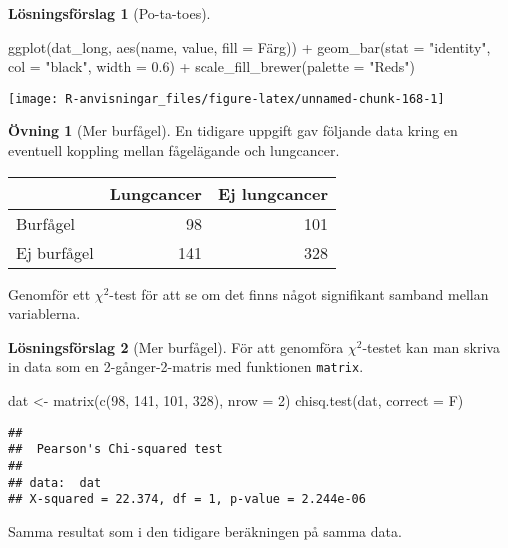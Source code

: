 \documentclass[
]{book}
\newenvironment{Shaded}{\begin{snugshade}}{\end{snugshade}}
\newcommand{\AttributeTok}[1]{\textcolor[rgb]{0.77,0.63,0.00}{#1}}
\newcommand{\DecValTok}[1]{\textcolor[rgb]{0.00,0.00,0.81}{#1}}
\newcommand{\FloatTok}[1]{\textcolor[rgb]{0.00,0.00,0.81}{#1}}
\newcommand{\FunctionTok}[1]{\textcolor[rgb]{0.00,0.00,0.00}{#1}}
\newcommand{\NormalTok}[1]{#1}
\newcommand{\OtherTok}[1]{\textcolor[rgb]{0.56,0.35,0.01}{#1}}
\newcommand{\SpecialCharTok}[1]{\textcolor[rgb]{0.00,0.00,0.00}{#1}}
\newcommand{\StringTok}[1]{\textcolor[rgb]{0.31,0.60,0.02}{#1}}
\theoremstyle{definition}
\theoremstyle{definition}
\theoremstyle{definition}
\newtheorem{exercise}{Övning}[chapter]
\theoremstyle{definition}
\newtheorem{hypothesis}{Lösningsförslag}[chapter]
\theoremstyle{remark}
\begin{document}
\begin{hypothesis}[Po-ta-toes]
\begin{Shaded}
\begin{Highlighting}[]
\FunctionTok{ggplot}\NormalTok{(dat\_long, }\FunctionTok{aes}\NormalTok{(name, value, }\AttributeTok{fill =}\NormalTok{ Färg)) }\SpecialCharTok{+}
  \FunctionTok{geom\_bar}\NormalTok{(}\AttributeTok{stat =} \StringTok{"identity"}\NormalTok{, }\AttributeTok{col =} \StringTok{"black"}\NormalTok{, }\AttributeTok{width =} \FloatTok{0.6}\NormalTok{) }\SpecialCharTok{+}
  \FunctionTok{scale\_fill\_brewer}\NormalTok{(}\AttributeTok{palette =} \StringTok{"Reds"}\NormalTok{)}
\end{Highlighting}
\end{Shaded}

\begin{center}\texttt{[image: R-anvisningar\_files/figure-latex/unnamed-chunk-168-1]} \end{center}

\end{hypothesis}

\begin{exercise}[Mer burfågel]
En tidigare uppgift gav följande data kring en eventuell koppling mellan fågelägande och lungcancer.

\begin{table}
\centering
\begin{tabular}[t]{lrr}
\toprule
  & Lungcancer & Ej lungcancer\\
\midrule
Burfågel & 98 & 101\\
Ej burfågel & 141 & 328\\
\bottomrule
\end{tabular}
\end{table}

Genomför ett \(\chi^2\)-test för att se om det finns något signifikant samband mellan variablerna.
\end{exercise}

\begin{hypothesis}[Mer burfågel]
För att genomföra \(\chi^2\)-testet kan man skriva in data som en 2-gånger-2-matris med funktionen \texttt{matrix}.

\begin{Shaded}
\begin{Highlighting}[]
\NormalTok{dat }\OtherTok{\textless{}{-}} \FunctionTok{matrix}\NormalTok{(}\FunctionTok{c}\NormalTok{(}\DecValTok{98}\NormalTok{, }\DecValTok{141}\NormalTok{, }\DecValTok{101}\NormalTok{, }\DecValTok{328}\NormalTok{), }\AttributeTok{nrow =} \DecValTok{2}\NormalTok{)}
\FunctionTok{chisq.test}\NormalTok{(dat, }\AttributeTok{correct =}\NormalTok{ F)}
\end{Highlighting}
\end{Shaded}

\begin{verbatim}
## 
##  Pearson's Chi-squared test
## 
## data:  dat
## X-squared = 22.374, df = 1, p-value = 2.244e-06
\end{verbatim}

Samma resultat som i den tidigare beräkningen på samma data.
\end{hypothesis}
\end{document}
